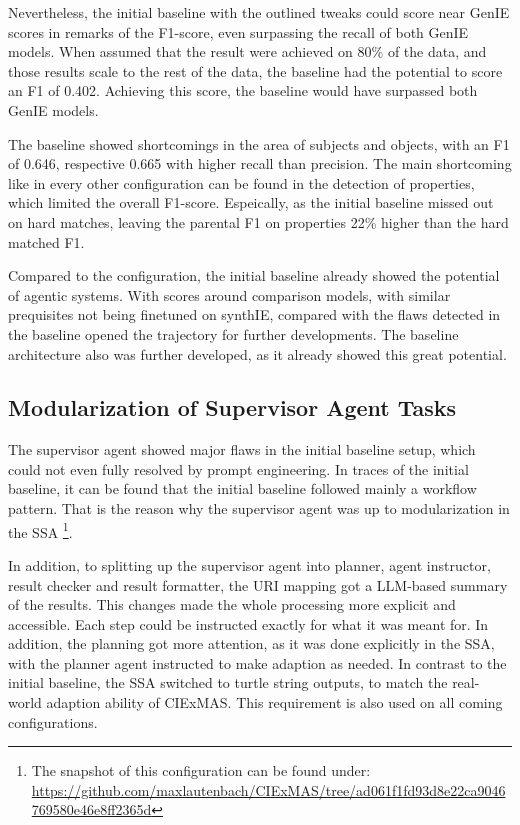 \documentclass[a4paper,oneside,bibliography=totoc]{scrbook}
\begin{document}
Nevertheless, the initial baseline with the outlined tweaks could score near GenIE scores in remarks of the F1-score, even surpassing the recall of both GenIE models. When assumed that the result were achieved on 80\% of the data, and those results scale to the rest of the data, the baseline had the potential to score an F1 of 0.402. Achieving this score, the baseline would have surpassed both GenIE models.

The baseline showed shortcomings in the area of subjects and objects, with an F1 of 0.646, respective 0.665 with higher recall than precision. The main shortcoming like in every other configuration can be found in the detection of properties, which limited the overall F1-score. Espeically, as the initial baseline missed out on hard matches, leaving the parental F1 on properties 22\% higher than the hard matched F1.

Compared to the configuration, the initial baseline already showed the potential of agentic systems. With scores around comparison models, with similar prequisites not being finetuned on synthIE, compared with the flaws detected in the baseline opened the trajectory for further developments. The baseline architecture also was further developed, as it already showed this great potential.

\subsection{Modularization of Supervisor Agent Tasks}
\label{subsec:modularization_agent_tasks}

The supervisor agent showed major flaws in the initial baseline setup, which could not even fully resolved by prompt engineering. In traces of the initial baseline, it can be found that the initial baseline followed mainly a workflow pattern. That is the reason why the supervisor agent was up to modularization in the \ac{SSA} \footnote{The snapshot of this configuration can be found under: \url{https://github.com/maxlautenbach/CIExMAS/tree/ad061f1fd93d8e22ca9046769580e46e8ff2365d}}.

In addition, to splitting up the supervisor agent into planner, agent instructor, result checker and result formatter, the URI mapping got a \ac{LLM}-based summary of the results. This changes made the whole processing more explicit and accessible. Each step could be instructed exactly for what it was meant for. In addition, the planning got more attention, as it was done explicitly in the \ac{SSA}, with the planner agent instructed to make adaption as needed. In contrast to the initial baseline, the \ac{SSA} switched to turtle string outputs, to match the real-world adaption ability of CIExMAS. This requirement is also used on all coming configurations.
\end{document}

